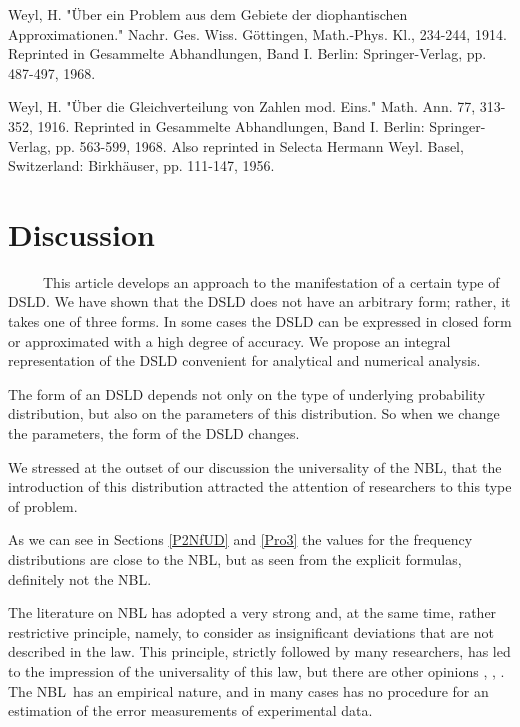 \documentclass[titlepage,fleqn]{article}%
\begin{document}
Weyl, H. "\"{U}ber ein Problem aus dem Gebiete der diophantischen
Approximationen." Nachr. Ges. Wiss. G\"{o}ttingen, Math.-Phys. Kl., 234-244,
1914. Reprinted in Gesammelte Abhandlungen, Band I. Berlin: Springer-Verlag,
pp. 487-497, 1968.

Weyl, H. "\"{U}ber die Gleichverteilung von Zahlen mod. Eins." Math. Ann. 77,
313-352, 1916. Reprinted in Gesammelte Abhandlungen, Band I. Berlin:
Springer-Verlag, pp. 563-599, 1968. Also reprinted in Selecta Hermann Weyl.
Basel, Switzerland: Birkh\"{a}user, pp. 111-147, 1956.

\section{Discussion}%

\label{Discussion}%


\ \ \ \ \ This article develops an approach to the manifestation of a certain
type of DSLD. We have shown that the DSLD does not have an arbitrary form;
rather, it takes one of three forms. In some cases the DSLD can be expressed
in closed form or approximated with a high degree of accuracy. We propose an
integral representation of the DSLD convenient for analytical and numerical analysis.

The form of an DSLD depends not only on the type of underlying probability
distribution, but also on the parameters of this distribution. So when we
change the parameters, the form of the DSLD changes.

We stressed at the outset of our discussion the universality of the NBL, that
the introduction of this distribution attracted the attention of researchers
to this type of problem.

As we can see in Sections
\ref{P2NfUD} and \ref{Pro3}
the values for the frequency distributions are close to the NBL, but as seen
from the explicit formulas, definitely not the NBL.

The literature on NBL has adopted a very strong and, at the same time, rather
restrictive principle, namely, to consider as insignificant deviations that
are not described in the law. This principle, strictly followed by many
researchers, has led to the impression of the universality of this law, but
there are other opinions
\cite{arnold0},
\cite{arnold1},
\cite{bergerhill}%
. The NBL\ has an empirical nature, and in many cases has no procedure for an
estimation of the error measurements of experimental data.
\end{document}
